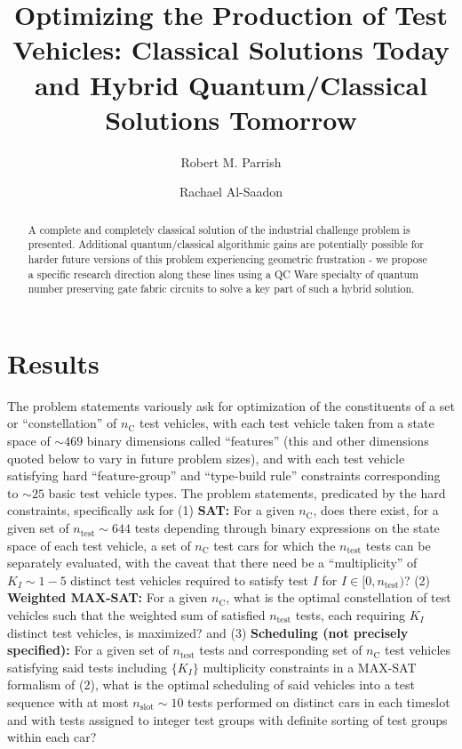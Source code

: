 \documentclass[aps,pra,twocolumn,superscriptaddress,groupedaddress]{revtex4}  %
\begin{document}

\title{
Optimizing the Production of Test Vehicles: Classical Solutions Today and Hybrid Quantum/Classical Solutions Tomorrow
}

\author{Robert M. Parrish}
\author{Rachael Al-Saadon}


\begin{abstract} 
A complete and completely classical solution of the industrial challenge problem
is presented.  Additional quantum/classical algorithmic gains are potentially
possible for harder future versions
of this problem experiencing geometric frustration - we propose a specific
research direction along these lines using a QC Ware specialty of quantum number
preserving gate fabric circuits to solve a key part of such a hybrid solution.
\end{abstract}

\maketitle

\section{Results}

The problem statements variously ask for optimization of the constituents of a
set or ``constellation'' of $n_{\mathrm{C}}$ test vehicles, with each test
vehicle taken from a state space of $\sim 469$ binary dimensions called
``features'' (this and other dimensions quoted below to vary in future problem
sizes), and with each test vehicle satisfying hard ``feature-group'' and
``type-build rule'' constraints corresponding to $\sim 25$ basic test vehicle
types. The problem statements, predicated by the hard constraints,
specifically ask for (1) \textbf{SAT:} For a given $n_{\mathrm{C}}$, does there
exist, for a given set of $n_{\mathrm{test}} \sim 644$ tests depending through
binary expressions on the state space of each test vehicle, a set of
$n_{\mathrm{C}}$ test cars for which the $n_{\mathrm{test}}$ tests can be
separately evaluated, with the caveat that there need be a ``multiplicity'' of $K_I \sim 1-5$ distinct
test vehicles required to satisfy test $I$ for $I \in [0, n_{\mathrm{test}})$?
(2) \textbf{Weighted MAX-SAT:} For a given $n_{\mathrm{C}}$, what is the optimal
constellation of test vehicles such that the weighted sum of satisfied
$n_{\mathrm{test}}$ tests, each requiring $K_I$ distinct test vehicles, is
maximized? and (3) \textbf{Scheduling (not precisely specified):} For a given
set of $n_{\mathrm{test}}$ tests and corresponding set of $n_{\mathrm{C}}$ test
vehicles satisfying said tests including $\{ K_I \}$ multiplicity constraints in
a MAX-SAT formalism of (2), what is the optimal scheduling of said vehicles into
a test sequence with at most $n_{\mathrm{slot}} \sim 10$ tests performed on
distinct cars in each timeslot and with tests assigned to integer test groups
with definite sorting of test groups within each car?
\end{document}
